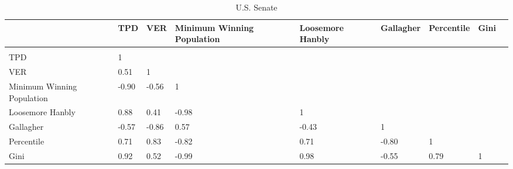 
\begin{landscape}

\begin{table}[!htbp] \centering 
  \caption{U.S. Senate} 
  \label{tab:cor_sen} 
\begin{tabular}{C{2.5cm}p{1.75cm}p{1.75cm}p{1.75cm}p{1.75cm}p{1.75cm}p{1.75cm}p{1.75cm}p{1.75cm}}
{} & {TPD} & {VER} & {Minimum Winning Population} & {Loosemore Hanbly} & {Gallagher} & {Percentile} & {Gini} \\ 
\hline \\[-1.8ex] 
{TPD} & 1 &  &  &  &  &  &  \\ 
{VER} & 0.51 & 1 &  &  &  &  &  \\ 
{Minimum Winning Population} & -0.90 & -0.56 & 1 &  &  &  &  \\ 
{Loosemore Hanbly} & 0.88 & 0.41 & -0.98 & 1 &  &  &  \\ 
{Gallagher} & -0.57 & -0.86 & 0.57 & -0.43 & 1 &  &  \\ 
{Percentile} & 0.71 & 0.83 & -0.82 & 0.71 & -0.80 & 1 &  \\ 
{Gini} & 0.92 & 0.52 & -0.99 & 0.98 & -0.55 & 0.79 & 1 \\ 
\end{tabular}
\tabnotes{}
\end{table}

\end{landscape}
 
